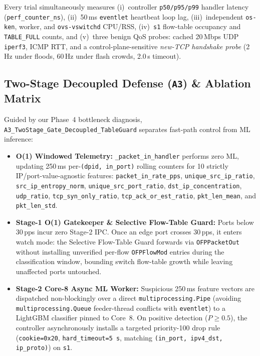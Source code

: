 \documentclass[conference]{IEEEtran}
\begin{document}
Every trial simultaneously measures (i)~controller \texttt{p50/p95/p99} handler latency (\texttt{perf\_counter\_ns}), (ii)~50\,ms \texttt{eventlet} heartbeat loop lag, (iii)~independent \texttt{os-ken}, worker, and \texttt{ovs-vswitchd} CPU/RSS, (iv)~\texttt{s1} flow-table occupancy and \texttt{TABLE\_FULL} counts, and (v)~three benign QoS probes: cached 20\,Mbps UDP \texttt{iperf3}, ICMP RTT, and a control-plane-sensitive \emph{new-TCP handshake probe} (2\,Hz under floods, 60\,Hz under flash crowds, 2.0\,s timeout).

\subsection{Two-Stage Decoupled Defense (\texttt{A3}) & Ablation Matrix}
Guided by our Phase~4 bottleneck diagnosis, \texttt{A3\_TwoStage\_Gate\_Decoupled\_TableGuard} separates fast-path control from ML inference:
\begin{itemize}
    \item \textbf{O(1) Windowed Telemetry:} \texttt{\_packet\_in\_handler} performs zero ML, updating 250\,ms per-\texttt{(dpid, in\_port)} rolling counters for 10 strictly IP/port-value-agnostic features: \texttt{packet\_in\_rate\_pps}, \texttt{unique\_src\_ip\_ratio}, \texttt{src\_ip\_entropy\_norm}, \texttt{unique\_src\_port\_ratio}, \texttt{dst\_ip\_concentration}, \texttt{udp\_ratio}, \texttt{tcp\_syn\_only\_ratio}, \texttt{tcp\_ack\_or\_est\_ratio}, \texttt{pkt\_len\_mean}, and \texttt{pkt\_len\_std}.
    \item \textbf{Stage-1 O(1) Gatekeeper \& Selective Flow-Table Guard:} Ports below 30\,pps incur zero Stage-2 IPC. Once an edge port crosses 30\,pps, it enters watch mode: the Selective Flow-Table Guard forwards via \texttt{OFPPacketOut} without installing unverified per-flow \texttt{OFPFlowMod} entries during the classification window, bounding switch flow-table growth while leaving unaffected ports untouched.
    \item \textbf{Stage-2 Core-8 Async ML Worker:} Suspicious 250\,ms feature vectors are dispatched non-blockingly over a direct \texttt{multiprocessing.Pipe} (avoiding \texttt{multiprocessing.Queue} feeder-thread conflicts with \texttt{eventlet}) to a LightGBM classifier pinned to Core~8. On positive detection ($P \ge 0.5$), the controller asynchronously installs a targeted priority-100 drop rule (\texttt{cookie=0x20}, \texttt{hard\_timeout=5\,s}, matching \texttt{(in\_port, ipv4\_dst, ip\_proto)}) on \texttt{s1}.
\end{itemize}
\end{document}
